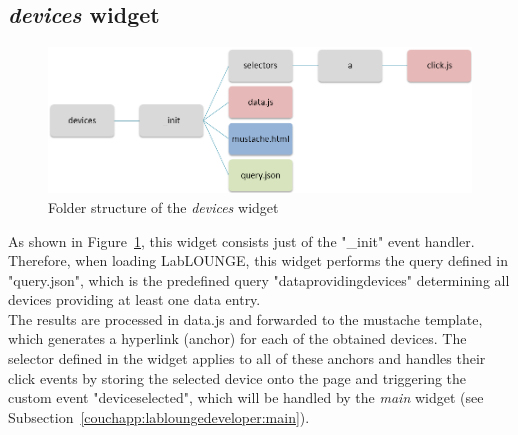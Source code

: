 \subsection{\emph{devices} widget}
\label{couchapp:labloungedeveloper:devices}
\begin{figure}[h!]
\centering
\includegraphics[width=1.0\columnwidth]{images/labloungestructuredevices.png}
\caption{Folder structure of the \emph{devices} widget}
\label{img:structuredevices}
\end{figure}
As shown in Figure~\ref{img:structuredevices}, this widget consists just of the "\_init" event handler. Therefore, when loading LabLOUNGE, this widget performs the query defined in "query.json", which is the predefined query "dataprovidingdevices" determining all devices providing at least one data entry.\\
The results are processed in data.js and forwarded to the mustache template, which generates a hyperlink (anchor) for each of the obtained devices. The selector defined in the widget applies to all of these anchors and handles their click events by storing the selected device onto the page and triggering the custom event "deviceselected", which will be handled by the \emph{main} widget (see Subsection~\ref{couchapp:labloungedeveloper:main}).


